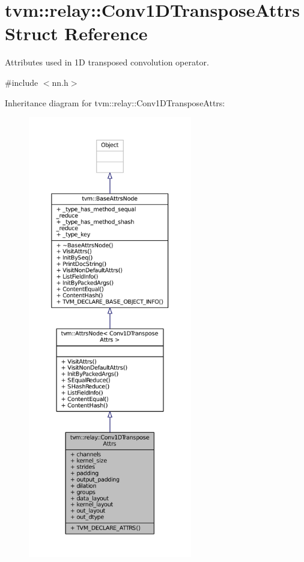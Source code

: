 \hypertarget{structtvm_1_1relay_1_1Conv1DTransposeAttrs}{}\section{tvm\+:\+:relay\+:\+:Conv1\+D\+Transpose\+Attrs Struct Reference}
\label{structtvm_1_1relay_1_1Conv1DTransposeAttrs}


Attributes used in 1D transposed convolution operator.  




{\ttfamily \#include $<$nn.\+h$>$}



Inheritance diagram for tvm\+:\+:relay\+:\+:Conv1\+D\+Transpose\+Attrs\+:
\nopagebreak
\begin{figure}[H]
\begin{center}
\leavevmode
\includegraphics[height=550pt]{structtvm_1_1relay_1_1Conv1DTransposeAttrs__inherit__graph}
\end{center}
\end{figure}


